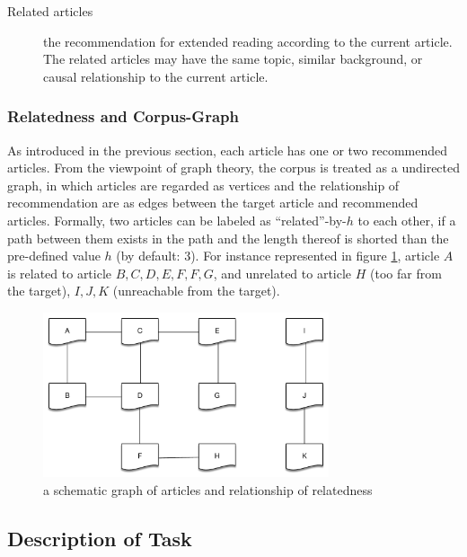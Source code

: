 \begin{description}
    \item[Related articles] the recommendation for extended reading according to the current article. The related articles may have the same topic, similar background, or causal relationship to the current article.

        
\end{description}

\subsubsection{Relatedness and Corpus-Graph}

As introduced in the previous section, each article has one or two recommended articles. From the viewpoint of graph theory, the corpus is treated as a undirected graph, in which articles are regarded as vertices and the relationship of recommendation are as edges between the target article and recommended articles. Formally, two articles can be labeled as ``related''-by-$h$ to each other, if a path between them exists in the path and the length thereof is shorted than the pre-defined value $h$ (by default: 3). For instance represented in figure \ref{fig:relatedness}, article $A$ is related to article $B, C, D, E, F, F, G$, and unrelated to  article $H$ (too far from the target), $I, J, K$ (unreachable from the target). 
 
\begin{figure}[!htb]
    \centering
    \includegraphics[width=0.75\textwidth]{fig/relatedness.pdf}
    \caption{a schematic graph of articles and relationship of relatedness}
    \label{fig:relatedness}
\end{figure}


\subsection{Description of Task}
\label{sec:3.2}

